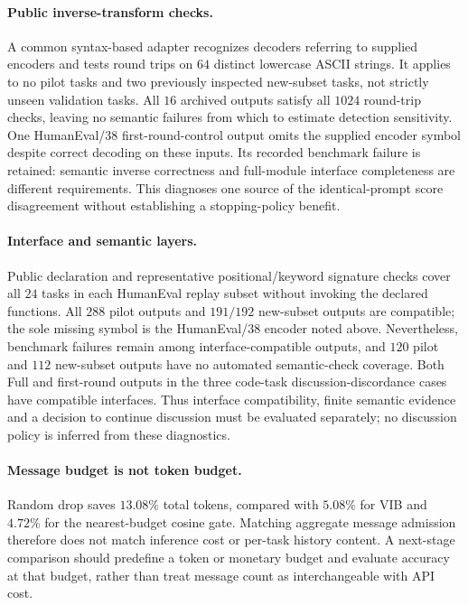 \documentclass[11pt,twoside,twocolumn,letterpaper]{article}
\begin{document}
\paragraph{Public inverse-transform checks.} A common syntax-based adapter recognizes decoders referring to supplied encoders and tests round trips on $64$ distinct lowercase ASCII strings. It applies to no pilot tasks and two previously inspected new-subset tasks, not strictly unseen validation tasks. All $16$ archived outputs satisfy all $1024$ round-trip checks, leaving no semantic failures from which to estimate detection sensitivity. One HumanEval/38 first-round-control output omits the supplied encoder symbol despite correct decoding on these inputs. Its recorded benchmark failure is retained: semantic inverse correctness and full-module interface completeness are different requirements. This diagnoses one source of the identical-prompt score disagreement without establishing a stopping-policy benefit.

\paragraph{Interface and semantic layers.} Public declaration and representative positional/keyword signature checks cover all $24$ tasks in each HumanEval replay subset without invoking the declared functions. All $288$ pilot outputs and $191/192$ new-subset outputs are compatible; the sole missing symbol is the HumanEval/38 encoder noted above. Nevertheless, benchmark failures remain among interface-compatible outputs, and $120$ pilot and $112$ new-subset outputs have no automated semantic-check coverage. Both Full and first-round outputs in the three code-task discussion-discordance cases have compatible interfaces. Thus interface compatibility, finite semantic evidence and a decision to continue discussion must be evaluated separately; no discussion policy is inferred from these diagnostics.

\paragraph{Message budget is not token budget.} Random drop saves $13.08\%$ total tokens, compared with $5.08\%$ for VIB and $4.72\%$ for the nearest-budget cosine gate. Matching aggregate message admission therefore does not match inference cost or per-task history content. A next-stage comparison should predefine a token or monetary budget and evaluate accuracy at that budget, rather than treat message count as interchangeable with API cost.
\end{document}
